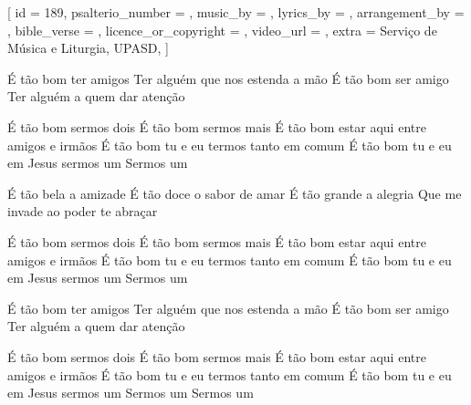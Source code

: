 [
    id                     = {189},
    psalterio_number       = {},
    music_by               = {},
    lyrics_by              = {},
    arrangement_by         = {},
    bible_verse            = {},
    licence_or_copyright   = {},
    video_url              = {},
    extra                  = {Serviço de Música e Liturgia, UPASD},
]


\beginverse
É tão bom ter amigos
Ter alguém que nos estenda a mão
É tão bom ser amigo
Ter alguém a quem dar atenção
\endverse


\beginchorus
É tão bom sermos dois
É tão bom sermos mais
É tão bom estar aqui entre amigos e irmãos
É tão bom tu e eu termos tanto em comum
É tão bom tu e eu em Jesus sermos um
Sermos um
\endchorus




\beginverse
É tão bela a amizade
É tão doce o sabor de amar
É tão grande a alegria
Que me invade ao poder te abraçar
\endverse


\beginchorus
É tão bom sermos dois
É tão bom sermos mais
É tão bom estar aqui entre amigos e irmãos
É tão bom tu e eu termos tanto em comum
É tão bom tu e eu em Jesus sermos um
Sermos um
\endchorus


\beginverse
É tão bom ter amigos
Ter alguém que nos estenda a mão
É tão bom ser amigo
Ter alguém a quem dar atenção
\endverse


\beginchorus
É tão bom sermos dois
É tão bom sermos mais
É tão bom estar aqui entre amigos e irmãos
É tão bom tu e eu termos tanto em comum
É tão bom tu e eu em Jesus sermos um
Sermos um
Sermos um
\endchorus
\endsong
